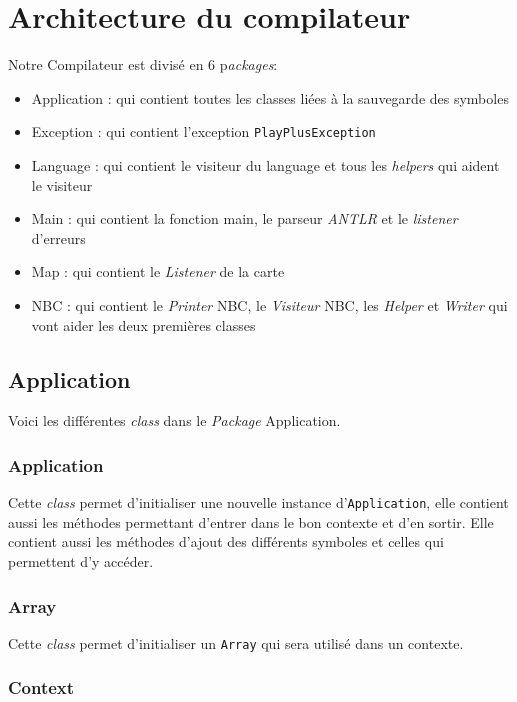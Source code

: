 \section{Architecture du compilateur}

Notre Compilateur est divisé en 6 p\emph{ackages}:
\begin{itemize}
    \item Application : qui contient toutes les classes liées à la sauvegarde des symboles
    \item Exception : qui contient l'exception \texttt{PlayPlusException}
    \item Language : qui contient le visiteur du language et tous les \emph{helpers} qui aident le visiteur
    \item Main : qui contient la fonction main, le parseur \emph{ANTLR} et le \emph{listener} d'erreurs
    \item Map : qui contient le \emph{Listener} de la carte
    \item NBC : qui contient le \emph{Printer} NBC, le \emph{Visiteur} NBC, les \emph{Helper} et \emph{Writer} qui vont aider les deux premières classes
\end{itemize}

\subsection{Application}

Voici les différentes \emph{class} dans le \emph{Package} Application.

\subsubsection{Application}

Cette \emph{class} permet d'initialiser une nouvelle instance d'\texttt{Application}, elle contient aussi les méthodes permettant d'entrer dans le bon contexte et d'en sortir.
Elle contient aussi les méthodes d'ajout des différents symboles et celles qui permettent d'y accéder.

\subsubsection{Array}

Cette \emph{class} permet d'initialiser un \texttt{Array} qui sera utilisé dans un contexte.

\subsubsection{Context}

